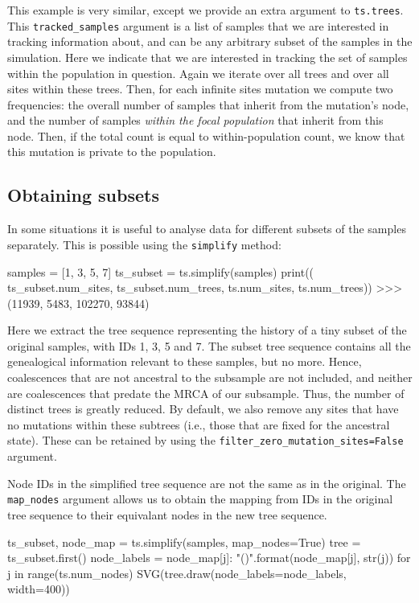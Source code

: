 \documentclass[graybox]{svmult}
\begin{document}
    This example is very similar, except we provide an extra argument to
\texttt{ts.trees}. This \texttt{tracked\_samples} argument is a list of
samples that we are interested in tracking information about, and can be
any arbitrary subset of the samples in the simulation. Here we indicate
that we are interested in tracking the set of samples within the
population in question. Again we iterate over all trees and over all
sites within these trees. Then, for each infinite sites mutation we
compute two frequencies: the overall number of samples that inherit from
the mutation's node, and the number of samples \emph{within the focal
population} that inherit from this node. Then, if the total count is
equal to within-population count, we know that this mutation is private
to the population.

\subsection{Obtaining subsets}\label{obtaining-subsets}

In some situations it is useful to analyse data for different subsets of
the samples separately. This is possible using the \texttt{simplify}
method:

\begin{pythoncode}
samples = [1, 3, 5, 7]
ts_subset = ts.simplify(samples)
print((
    ts_subset.num_sites, ts_subset.num_trees,
    ts.num_sites, ts.num_trees))
>>> (11939, 5483, 102270, 93844)
\end{pythoncode}

Here we extract the tree sequence representing the history of a tiny
subset of the original samples, with IDs 1, 3, 5 and 7. The subset tree
sequence contains all the genealogical information relevant to these
samples, but no more. Hence, coalescences that are not ancestral to the
subsample are not included, and neither are coalescences that predate
the MRCA of our subsample. Thus, the number of distinct trees is greatly
reduced. By default, we also remove any sites that have no mutations
within these subtrees (i.e., those that are fixed for the ancestral
state). These can be retained by using the
\texttt{filter\_zero\_mutation\_sites=False} argument.

Node IDs in the simplified tree sequence are not the same as in the
original. The \texttt{map\_nodes} argument allows us to obtain the
mapping from IDs in the original tree sequence to their equivalant nodes
in the new tree sequence.

\begin{pythoncode}
ts_subset, node_map = ts.simplify(samples, map_nodes=True)
tree = ts_subset.first()
node_labels = {
    node_map[j]: "{}({})".format(node_map[j], str(j)) for j in
range(ts.num_nodes)}
SVG(tree.draw(node_labels=node_labels, width=400))
\end{pythoncode}
\end{document}
